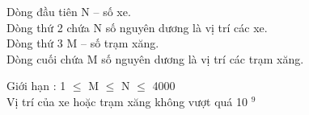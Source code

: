 Dòng đầu tiên N – số xe.   
\\   Dòng thứ 2 chứa N số nguyên dương là vị trí các xe.   
\\   Dòng thứ 3 M – số trạm xăng.   
\\   Dòng cuối chứa M số nguyên dương là vị trí các trạm xăng.  

    Giới hạn :      1 $\le$  M  $\le$  N  $\le$  4000   
\\   Vị trí của xe hoặc trạm xăng không vượt quá 10   $^    9   $